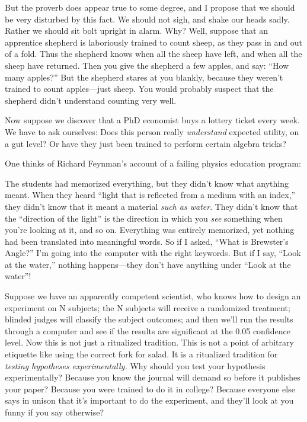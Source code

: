 {
 But the proverb does appear true to some degree, and I propose
that we should be very disturbed by this fact. We should not sigh, and
shake our heads sadly. Rather we should sit bolt upright in alarm. Why?
Well, suppose that an apprentice shepherd is laboriously trained to
count sheep, as they pass in and out of a fold. Thus the shepherd knows
when all the sheep have left, and when all the sheep have returned.
Then you give the shepherd a few apples, and say:
``How many apples?'' But the
shepherd stares at you blankly, because they weren't
trained to count apples---just sheep. You would probably suspect that
the shepherd didn't understand counting very well.}

{
 Now suppose we discover that a PhD economist buys a lottery ticket
every week. We have to ask ourselves: Does this person really
\textit{understand} expected utility, on a gut level? Or have they just
been trained to perform certain algebra tricks?}

{
 One thinks of Richard Feynman's account of a
failing physics education program:}

{
 The students had memorized everything, but they
didn't know what anything meant. When they heard
``light that is reflected from a medium with an
index,'' they didn't know that it
meant a material \textit{such as water}. They didn't
know that the ``direction of the
light'' is the direction in which you \textit{see}
something when you're looking at it, and so on.
Everything was entirely memorized, yet nothing had been translated into
meaningful words. So if I asked, ``What is
Brewster's Angle?''
I'm going into the computer with the right keywords.
But if I say, ``Look at the water,''
nothing happens---they don't have anything under
``Look at the water''!}

{
 Suppose we have an apparently competent scientist, who knows how
to design an experiment on N subjects; the N subjects will receive a
randomized treatment; blinded judges will classify the subject
outcomes; and then we'll run the results through a
computer and see if the results are significant at the 0.05 confidence
level. Now this is not just a ritualized tradition. This is not a point
of arbitrary etiquette like using the correct fork for salad. It is a
ritualized tradition for \textit{testing hypotheses experimentally.}
Why should you test your hypothesis experimentally? Because you know
the journal will demand so before it publishes your paper? Because you
were trained to do it in college? Because everyone else says in unison
that it's important to do the experiment, and
they'll look at you funny if you say otherwise?}

